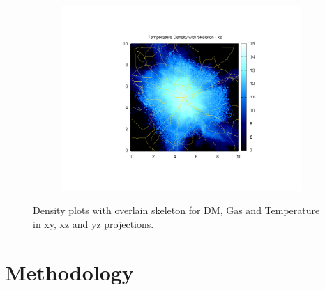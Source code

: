 \documentclass[journal]{IEEEtran}
\begin{document}
\begin{figure}[!t]
\begin{subfigure}[t]{0.3\textwidth}
		\includegraphics[width=\linewidth]{TempDenSkelxz.pdf}
	\end{subfigure}
\label{fig:densities}
\caption{Density plots with overlain skeleton for DM, Gas and Temperature in xy, xz and yz projections.}
\end{figure}


\section{Methodology}
\end{document}
